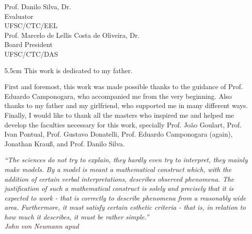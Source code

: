 \begin{folhadeaprovacao}
	\vspace*{2\baselineskip}
	Prof. Danilo Silva, Dr.\\
	Evaluator \\
	UFSC/CTC/EEL\\
	
	\vspace*{2\baselineskip}
	Prof. Marcelo de Lellis Costa de Oliveira, Dr.\\
	Board President \\
	UFSC/CTC/DAS
\end{folhadeaprovacao}

\begin{dedicatoria}
	\vspace*{\fill}
	\noindent
	\begin{adjustwidth*}{}{5.5cm} 
		\raggedleft       
		This work is dedicated to my father.
	\end{adjustwidth*}
\end{dedicatoria}

\begin{agradecimentos}
    First and foremost, this work was made possible thanks to the guidance of Prof. Eduardo Camponogara, who accompanied me from the very beginning.
    Also thanks to my father and my girlfriend, who supported me in many different ways.
    Finally, I would like to thank all the masters who inspired me and helped me develop the faculties necessary for this work, specially Prof. João Goulart, Prof. Ivan Pontual, Prof. Gustavo Donatelli, Prof. Eduardo Camponogara (again), Jonathan Krauß, and Prof. Danilo Silva.
\end{agradecimentos}

\begin{epigrafe}
	\vspace*{\fill}
	\begin{flushright}
		\textit{``The sciences do not try to explain, they hardly even try to interpret, they mainly make models. By a model is meant a mathematical construct which, with the addition of certain verbal interpretations, describes observed phenomena. The justification of such a mathematical construct is solely and precisely that it is expected to work - that is correctly to describe phenomena from a reasonably wide area. Furthermore, it must satisfy certain esthetic criteria - that is, in relation to how much it describes, it must be rather simple.''\\
		\emph{John von Neumann} apud \emph{\textcite{leary_unity_1955}}}
	\end{flushright}
\end{epigrafe}

